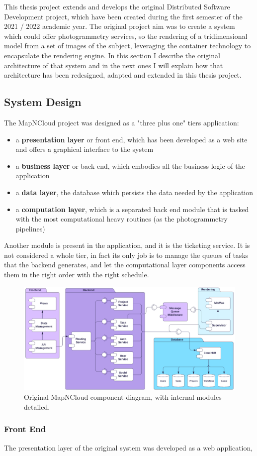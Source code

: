 This thesis project extends and develops the original Distributed Software Development project, which have been created during the first semester of the 2021 / 2022 academic year. The original project aim was to create a system which could offer photogrammetry services, so the rendering of a tridimensional model from a set of images of the subject, leveraging the container technology to encapsulate the rendering engine. In this section I describe the original architecture of that system and in the next ones I will explain how that architecture has been redesigned, adapted and extended in this thesis project. 

\subsection{System Design}
\label{sse:originalsystemdesign}
  The MapNCloud project was designed as a "three plus one" tiers application:
  \begin{itemize}
    \item a \textbf{presentation layer} or front end, which has been developed as a web site and offers a graphical interface to the system
    \item a \textbf{business layer} or back end, which embodies all the business logic of the application
    \item a \textbf{data layer}, the database which persists the data needed by the application
    \item a \textbf{computation layer}, which is a separated back end module that is tasked with the most computational heavy routines (as the photogrammetry pipelines)
  \end{itemize}
  Another module is present in the application, and it is the ticketing service. It is not considered a whole tier, in fact its only job is to manage the queues of tasks that the backend generates, and let the computational layer components access them in the right order with the right schedule.
  \begin{figure}[H]
    \centering
    \includegraphics[width = \textwidth]{../Images/MNCOriginal.png}
    \caption{Original MapNCloud component diagram, with internal modules detailed.}
  \end{figure}

  \subsubsection{Front End}
  \label{ssse:originalfrontend}
    The presentation layer of the original system was developed as a web application, %
